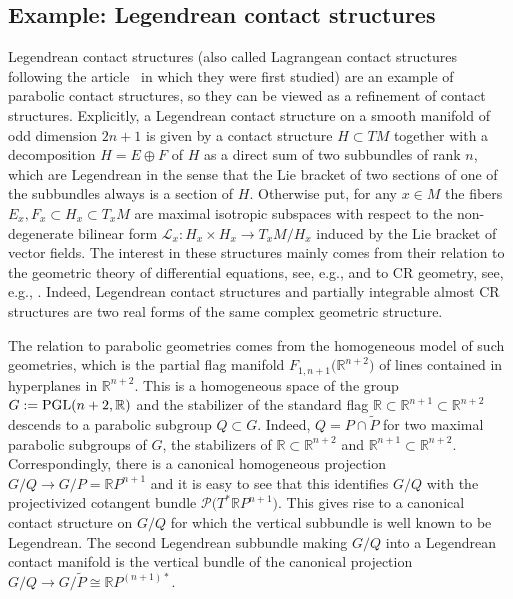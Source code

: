 \documentclass[10pt,a4paper]{amsart}
\numberwithin{equation}{section}
\def\Bbb{\mathbb}
\def\Cal{\mathcal}
\newcommand{\x}{\times}
\begin{document}
\subsection{Example: Legendrean contact structures}\label{3.4}
Legendrean contact structures (also called Lagrangean contact structures following
the article~\cite{Takeuchi} in which they were first studied) are an example of
parabolic contact structures, so they can be viewed as a refinement of contact
structures. Explicitly, a Legendrean contact structure on a smooth manifold of odd
dimension $2n+1$ is given by a contact structure $H\subset TM$ together with a
decomposition $H=E\oplus F$ of $H$ as a direct sum of two subbundles of rank $n$,
which are Legendrean in the sense that the Lie bracket of two sections of one of the
subbundles always is a section of $H$. Otherwise put, for any $x\in M$ the fibers
$E_x,F_x\subset H_x\subset T_xM$ are maximal isotropic subspaces with respect to the
non-degenerate bilinear form $\Cal L_x\colon H_x\x H_x\to T_xM/H_x$ induced by the Lie
bracket of vector fields. The interest in these structures mainly comes from their
relation to the geometric theory of differential equations, see, e.g., \cite{MFMZ} and
to CR geometry, see, e.g., \cite{Doubrov-Merker-The}. Indeed, Legendrean contact
structures and partially integrable almost CR structures are two real forms of the
same complex geometric structure.

The relation to parabolic geometries comes from the homogeneous model of such
geometries, which is the partial flag manifold $F_{1,n+1}\bigl(\Bbb R^{n+2}\bigr)$ of lines
contained in hyperplanes in $\mathbb R^{n+2}$. This is a homogeneous space of the
group $G:={\rm PGL}(n+2,\Bbb R)$ and the stabilizer of the standard flag
$\Bbb R\subset\Bbb R^{n+1}\subset\Bbb R^{n+2}$ descends to a parabolic subgroup
$Q\subset G$. Indeed, $Q=P\cap\tilde P$ for two maximal parabolic subgroups of $G$,
the stabilizers of $\Bbb R\subset\Bbb R^{n+2}$ and $\Bbb R^{n+1}\subset\Bbb
R^{n+2}$. Correspondingly, there is a canonical homogeneous projection
$G/Q\to G/P=\Bbb RP^{n+1}$ and it is easy to see that this identifies $G/Q$ with the
projectivized cotangent bundle $\Cal P\bigl(T^*\Bbb RP^{n+1}\bigr)$. This gives rise to a
canonical contact structure on $G/Q$ for which the vertical subbundle is well known
to be Legendrean. The second Legendrean subbundle making $G/Q$ into a Legendrean
contact manifold is the vertical bundle of the canonical projection
$G/Q\to G/\tilde P\cong\Bbb RP^{(n+1)*}$.
\end{document}
